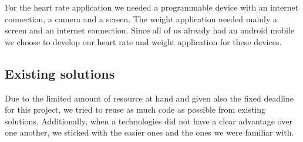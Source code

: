 For the heart rate application we needed a programmable device with an internet connection, a camera and a screen.
The weight application needed mainly a screen and an internet connection.
Since all of us already had an android mobile we choose to develop our heart rate and weight application for these devices.
\fi

\subsection{Existing solutions}

Due to the limited amount of resource at hand and given also the fixed deadline for this project,
we tried to reuse as much code as possible from existing solutions.
Additionally, when a technologies did not have a clear advantage over one another,
we sticked with the easier ones and the ones we were familiar with.

